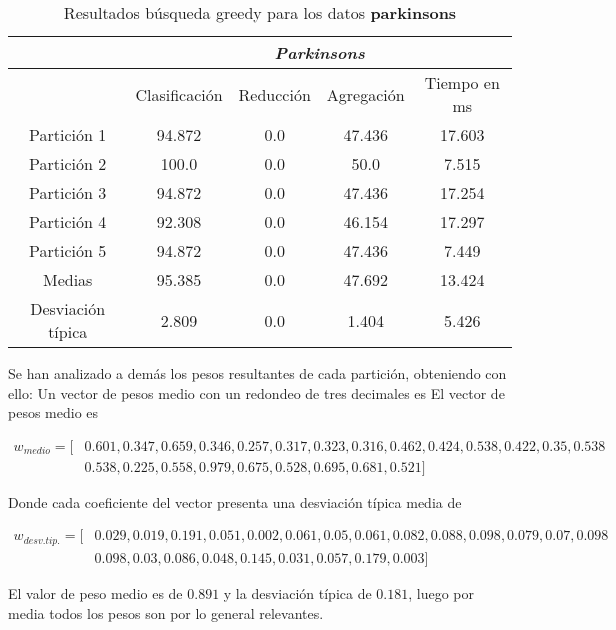   \begin{table}[H]
    \centering
    \begin{tabular}{|c|c|c|c|c|}
      \hline
      & \multicolumn{4}{|c|}{\textit{Parkinsons}}  \\
      \hline
      &	Clasificación &		Reducción	
      &	Agregación	&	Tiempo en ms \\
      \hline
      Partición 1	&    94.872  &  0.0  &  47.436  &  17.603   \\
      Partición 2 &	   100.0  &  0.0  &  50.0  &  7.515   \\
      Partición 3 &    94.872  &  0.0  &  47.436  &  17.254    \\
      Partición 4	&    92.308  &  0.0  &  46.154  &  17.297  \\
      Partición 5	&    94.872  &  0.0  &  47.436  &  7.449   \\
      \hline
      Medias 	 &    95.385  &  0.0  &  47.692  &  13.424   \\
      \hline
      Desviación típica &	   2.809  &  0.0  &  1.404  &  5.426   \\ 
      \hline  
    \end{tabular}
    \caption{Resultados búsqueda greedy para los datos \textbf{parkinsons}}
    \label{table:greedy_parkinson}
  \end{table}
  
  Se han analizado a demás los pesos resultantes de cada partición, obteniendo con ello: 
  Un vector de pesos medio con un redondeo de tres decimales es 
  El vector de pesos medio es 

\begin{align*}
  w_{medio} = [ 
    & 0.601, 0.347, 0.659, 0.346, 0.257, 0.317, 0.323, 0.316, 0.462, 0.424, 0.538, 0.422, 0.35, 0.538 \\
    & 0.538, 0.225, 0.558, 0.979, 0.675, 0.528, 0.695, 0.681, 0.521]
  \end{align*}
  
  Donde cada coeficiente del vector presenta una desviación típica media de 
  
  \begin{align*}
    w_{desv. tip.} = [ 
      & 0.029, 0.019, 0.191, 0.051, 0.002, 0.061, 0.05, 0.061, 0.082, 0.088, 0.098, 0.079, 0.07, 0.098 \\
      & 0.098, 0.03, 0.086, 0.048, 0.145, 0.031, 0.057, 0.179, 0.003
     ]
\end{align*}

El valor de peso medio es de $0.891$ y la desviación típica de $0.181$, luego por media todos los pesos son por lo general relevantes. 

